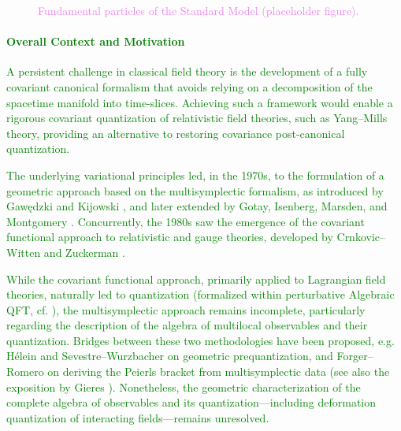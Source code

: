 \documentclass[11pt,draftproposal]{msca-pf}
\begin{document}
\begin{figure}[htbp]
  \centering
  \textcolor{violet}{}
  \caption{\textcolor{violet}{Fundamental particles of the Standard Model (placeholder figure).}}
  \label{fig:sm}
\end{figure}

\paragraph{\textcolor{green}{Overall Context and Motivation}}

\textcolor{green}{A persistent challenge in classical field theory is the development of a fully covariant canonical formalism that avoids relying on a decomposition of the spacetime manifold into time-slices. Achieving such a framework would enable a rigorous covariant quantization of relativistic field theories, such as Yang--Mills theory, providing an alternative to restoring covariance post-canonical quantization.}

\textcolor{green}{The underlying variational principles led, in the 1970s, to the formulation of a geometric approach based on the multisymplectic formalism, as introduced by Gaw\k{e}dzki \cite{Gawedzki-1972} and Kijowski \cite{Kijowski-1973}, and later extended by Gotay, Isenberg, Marsden, and Montgomery \cite{Gotay-1991, Gimmsy1}. Concurrently, the 1980s saw the emergence of the covariant functional approach to relativistic and gauge theories, developed by Crnkovic--Witten \cite{Crnkovic-Witten:1987} and Zuckerman \cite{Zuckerman:1987}.}

\textcolor{green}{While the covariant functional approach, primarily applied to Lagrangian field theories, naturally led to quantization (formalized within perturbative Algebraic QFT, cf. \cite{Brunetti-Fredenhagen-Verch-2003, Rejzner-2016}), the multisymplectic approach remains incomplete, particularly regarding the description of the algebra of multilocal observables and their quantization. Bridges between these two methodologies have been proposed, e.g. Hélein \cite{Helein:2011} and Sevestre--Wurzbacher \cite{Sevestre2021} on geometric prequantization, and Forger--Romero \cite{Forger2005} on deriving the Peierls bracket from multisymplectic data (see also the exposition by Gieres \cite{Gieres:2021}). Nonetheless, the geometric characterization of the complete algebra of observables and its quantization---including deformation quantization of interacting fields---remains unresolved.}
\end{document}
